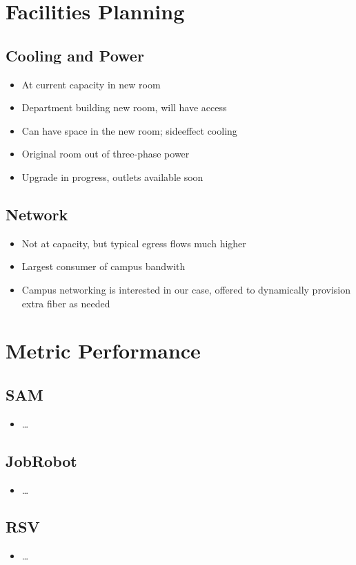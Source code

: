 \documentclass{beamer}
\begin{document}
\section{Facilities Planning}
\subsection{Cooling and Power}
\begin{frame}
\begin{itemize}
    \item At current capacity in new room
    \item Department building new room, will have access
    \item Can have space in the new room; sideeffect cooling
    \item Original room out of three-phase power
    \item Upgrade in progress, outlets available soon
\end{itemize}
\end{frame}

\subsection{Network}
\begin{frame}
\begin{itemize}
    \item Not at capacity, but typical egress flows much higher
    \item Largest consumer of campus bandwith
    \item Campus networking is interested in our case, offered to dynamically provision extra fiber as needed
\end{itemize}
\end{frame}

\section{Metric Performance}
\subsection{SAM}
\begin{frame}
\begin{itemize}
    \item \ldots{}
\end{itemize}
\end{frame}

\subsection{JobRobot}
\begin{frame}
\begin{itemize}
    \item \ldots{}
\end{itemize}
\end{frame}

\subsection{RSV}
\begin{frame}
\begin{itemize}
    \item \ldots{}
\end{itemize}
\end{frame}
\end{document}
